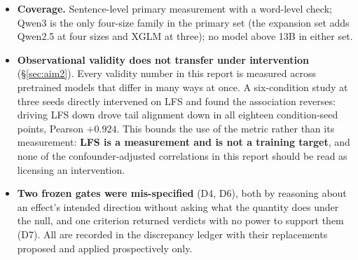 \documentclass[11pt,a4paper]{article}
\begin{document}
\begin{itemize}
  advantage is \textbf{an assumption, not a result}; and
  Belebele is likewise FLORES-derived and English-sourced, so the
  \emph{entire} validation loop currently lives in the translated-news
  domain. The FLORES-200 replication (\S\ref{sec:replication}) now covers the
  corpus side; natively-sourced targets (e.g., TyDiQA-style) remain the
  planned remedy for the benchmark side.
  \item \textbf{Coverage.} Sentence-level primary measurement with a
  word-level check; Qwen3 is the only four-size family in the primary set
  (the expansion set adds Qwen2.5 at four sizes and XGLM at three); no
  model above 13B in either set.
  \item \textbf{Observational validity does not transfer under
  intervention} (\S\ref{sec:aim2}). Every validity number in this report is
  measured across pretrained models that differ in many ways at once. A
  six-condition study at three seeds directly intervened on LFS and found the
  association reverses: driving LFS down drove tail alignment down in all
  eighteen condition-seed points, Pearson $+0.924$. This bounds the use of the
  metric rather than its measurement: \textbf{LFS is a measurement and is not
  a training target}, and none of the confounder-adjusted correlations in this report
  should be read as licensing an intervention.
  \item \textbf{Two frozen gates were mis-specified} (D4, D6), both by
  reasoning about an effect's intended direction without asking what the
  quantity does under the null, and one criterion returned verdicts with no
  power to support them (D7). All are recorded in the discrepancy ledger with
  their replacements proposed and applied prospectively only.
\end{itemize}

\end{document}
